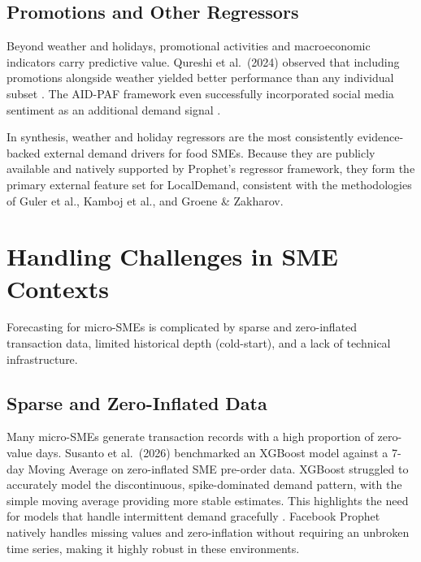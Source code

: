 \documentclass[conference]{IEEEtran}
\begin{document}
\subsection{Promotions and Other Regressors}

Beyond weather and holidays, promotional activities and macroeconomic 
indicators carry predictive value. Qureshi et al.\ (2024) observed that 
including promotions alongside weather yielded better performance than any 
individual subset \cite{qureshi2024}. The AID-PAF framework even successfully 
incorporated social media sentiment as an additional demand signal \cite{aidpaf}. 

In synthesis, weather and holiday regressors are the most consistently 
evidence-backed external demand drivers for food SMEs. Because they are 
publicly available and natively supported by Prophet's regressor framework, 
they form the primary external feature set for LocalDemand, consistent with 
the methodologies of Guler et al., Kamboj et al., and Groene \& Zakharov.

\section{Handling Challenges in SME Contexts}

Forecasting for micro-SMEs is complicated by sparse and zero-inflated 
transaction data, limited historical depth (cold-start), and a lack of 
technical infrastructure.

\subsection{Sparse and Zero-Inflated Data}

Many micro-SMEs generate transaction records with a high proportion of 
zero-value days. Susanto et al.\ (2026) benchmarked an XGBoost model 
against a 7-day Moving Average on zero-inflated SME pre-order data. 
XGBoost struggled to accurately model the discontinuous, spike-dominated 
demand pattern, with the simple moving average providing more stable 
estimates. This highlights the need for models that handle intermittent 
demand gracefully \cite{susanto2026}. Facebook Prophet natively handles 
missing values and zero-inflation without requiring an unbroken time 
series, making it highly robust in these environments.
\end{document}
